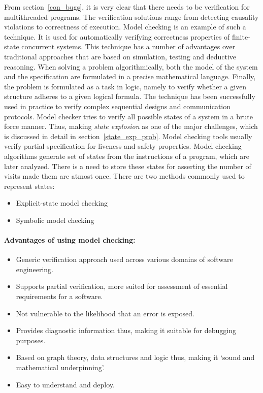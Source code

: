 From section~\ref{con_bugs}, it is very clear that there needs to be verification for multithreaded programs. 
The verification solutions range from detecting causality violations to correctness of execution\cite{d2008survey}. 
Model checking is an example of such a technique. 
It is used for automatically verifying correctness properties of finite-state concurrent systems\cite{model_check}\cite{berard2013systems}. 
This technique has a number of advantages over traditional approaches that are based on simulation, testing and deductive reasoning. 
When solving a problem algorithmically, both the model of the system and the specification are formulated in a precise mathematical language. 
Finally, the problem is formulated as a task in logic, namely to verify whether a given structure adheres to a given logical formula.  
The technique has been successfully used in practice to verify complex sequential designs and communication protocols\cite{model_check}. 
Model checker tries to verify all possible states of a system in a brute force manner\cite{model_checking_principles}. 
Thus, making \emph{state explosion} as one of the major challenges, which is discussed in detail in section~\ref{state_exp_prob}.  
Model checking tools usually verify partial specification for liveness and safety properties\cite{d2008survey}. 
Model checking algorithms generate set of states from the instructions of a program, which are later analyzed. 
There is a need to store these states for asserting the number of visits made them are atmost once. 
There are two methods commonly used to represent states:
\begin{itemize}
\item	Explicit-state model checking
\item	Symbolic model checking
\end{itemize}

\paragraph{Advantages of using model checking:} 
\begin{itemize}
\item	Generic verification approach used across various domains of software engineering.
\item 	Supports partial verification, more suited for assessment of essential requirements for a software.
\item 	Not vulnerable to the likelihood that an error is exposed. 
\item  	Provides diagnostic information thus, making it suitable for debugging purposes. 
\item	Based on graph theory, data structures and logic thus, making it `sound and mathematical underpinning'. 
\item 	Easy to understand and deploy. 

\end{itemize}


